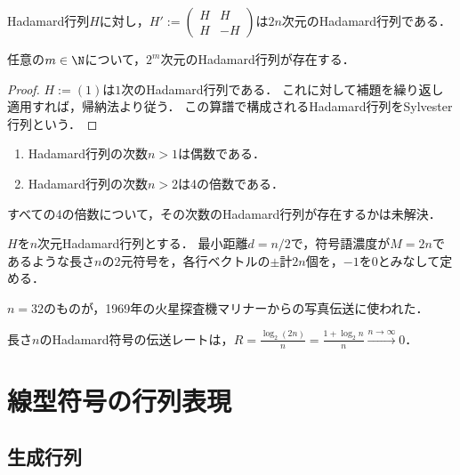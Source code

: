 \documentclass[uplatex,dvipdfmx]{jsreport}
\begin{document}
\begin{lemma}
    Hadamard行列$H$に対し，$H':=\begin{pmatrix}H&H\\H&-H\end{pmatrix}$は$2n$次元のHadamard行列である．
\end{lemma}

\begin{corollary}
    任意の$m\in\N$について，$2^m$次元のHadamard行列が存在する．
\end{corollary}
\begin{proof}
    $H:=(1)$は$1$次のHadamard行列である．
    これに対して補題を繰り返し適用すれば，帰納法より従う．
    この算譜で構成されるHadamard行列をSylvester行列という．
\end{proof}

\begin{proposition}\mbox{}
    \begin{enumerate}
        \item Hadamard行列の次数$n>1$は偶数である．
        \item Hadamard行列の次数$n>2$は4の倍数である．
    \end{enumerate}
\end{proposition}
\begin{remark}
    すべての4の倍数について，その次数のHadamard行列が存在するかは未解決．
\end{remark}

\begin{theorem}
    $H$を$n$次元Hadamard行列とする．
    最小距離$d=n/2$で，符号語濃度が$M=2n$であるような長さ$n$の2元符号を，各行ベクトルの$\pm$計$2n$個を，$-1$を$0$とみなして定める．
\end{theorem}
\begin{history}
    $n=32$のものが，1969年の火星探査機マリナーからの写真伝送に使われた．
\end{history}

\begin{proposition}
    長さ$n$のHadamard符号の伝送レートは，$R=\frac{\log_2(2n)}{n}=\frac{1+\log_2n}{n}\xrightarrow{n\to\infty}0$．
\end{proposition}


\section{線型符号の行列表現}

\subsection{生成行列}
\end{document}
